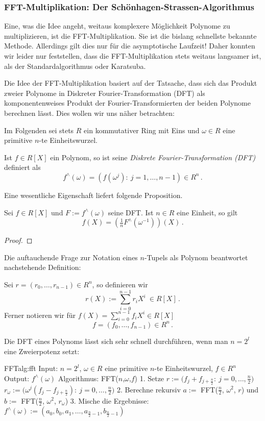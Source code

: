 \subsubsection{FFT-Multiplikation: Der Schönhagen-Strassen-Algorithmus}
Eine, was die Idee angeht, weitaus komplexere Möglichkeit Polynome zu
multiplizieren, ist die FFT-Multiplikation. Sie ist die bislang schnellste
bekannte Methode. Allerdings gilt dies nur für die asymptotische Laufzeit!
Daher konnten wir leider nur feststellen, dass die FFT-Multiplikation stets
weitaus langsamer ist, als der Standardalgorithmus oder Karatsuba.

Die Idee der FFT-Multiplikation basiert auf der Tatsache, dass sich das Produkt
zweier Polynome in Diskreter Fourier-Transformation (DFT) als komponentenweises
Produkt der Fourier-Transformierten der beiden Polynome berechnen lässt. 
Dies wollen wir uns näher betrachten:

Im Folgenden sei stets $R$ ein kommutativer Ring mit Eins und 
$\omega\in R$ eine primitive $n$-te Einheitswurzel.

\begin{definition}
   Ist $f\in R[X]$ ein Polynom, so ist seine
  \emph{Diskrete Fourier-Transformation (DFT)} definiert als
  \[ f^\wedge(\omega) = (f(\omega^j):\ j=1,\ldots,n-1) \in R^n\,.\]
\end{definition}

Eine wesentliche Eigenschaft liefert folgende Proposition. 

\begin{prop}
  Sei $f \in R[X]$ und $F := f^\wedge(\omega)$ seine DFT. Ist 
  $n \in R$ eine Einheit, so gilt
  \[ f(X) = (\tfrac 1 n F^\wedge(\omega^{-1}))(X) \,.\]
\end{prop}
\begin{proof}
  
\end{proof}

Die auftauchende Frage zur Notation eines $n$-Tupels als Polynom beantwortet
nachstehende Definition:

\begin{definition}
  Sei $r = (r_0,\ldots,r_{n-1})\in R^n$, so definieren wir 
  \[ r(X) := \sum_{i=0}^{n-1} r_i X^i \ \in R[X] \,.\]
  Ferner notieren wir für 
  $f(X) = \sum_{i=0}^{n-1} f_i X^i \in R[X]$
  \[ f = (f_0,\ldots,f_{n-1}) \in R^n \,.\]
\end{definition}

Die DFT eines Polynoms lässt sich sehr schnell durchführen, wenn man
$n = 2^l$ eine Zweierpotenz setzt:
\begin{pseudocode}{FFT}{alg:fft}
Input: $n = 2^l$, $\omega \in R$ eine primitive $n$-te Einheitswurzel, $f \in R^n$
Output: $f^\wedge(\omega)$
Algorithmus: FFT($n$,$\omega$,$f$)
  1. Setze
    $r := \big(f_j + f_{j+\frac n 2}:\ j=0,\ldots,\tfrac n 2\big)$
    $r_\omega := \big( \omega^j (f_j - f_{j+\frac n 2}):\
         j=0,\ldots,\tfrac n 2\big)$
  2. Berechne rekursiv $a := $ FFT($\tfrac n 2$, $\omega^2$, $r$) und $b := $ FFT($\tfrac n 2$, $\omega^2$, $r_\omega$)
  3. Mische die Ergebnisse: $f^\wedge(\omega) := (a_0,b_0,a_1,\ldots,
      a_{\frac n 2 -1},b_{\frac n 2 -1})$
\end{pseudocode}

